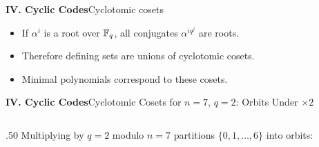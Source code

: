 \begin{frame}{\textbf{IV. Cyclic Codes}}{Cyclotomic cosets}
\small
{}
\begin{itemize}
  \item If $\alpha^i$ is a root over $\mathbb{F}_q$, all conjugates $\alpha^{iq^j}$ are roots.
  \item Therefore defining sets are unions of cyclotomic cosets.
  \item Minimal polynomials correspond to these cosets.
\end{itemize}
\end{frame}

\begin{frame}{\textbf{IV. Cyclic Codes}}{Cyclotomic Cosets for $n=7$, $q=2$: Orbits Under $\times 2$}
\small
\begin{columns}[T,onlytextwidth]
  \begin{column}{.50\textwidth}
    Multiplying by $q=2$ modulo $n=7$ partitions $\{0,1,\ldots,6\}$ into orbits:


\end{column}
\end{columns}
\end{frame}
